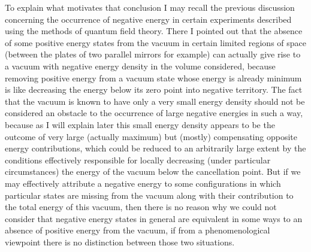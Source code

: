\documentclass[notitlepage,12pt]{report}
\begin{document}
To explain what motivates that conclusion I may recall the previous discussion concerning the occurrence of negative energy in certain experiments described using the methods of quantum field theory. There I pointed out that the absence of some positive energy states from the vacuum in certain limited regions of space (between the plates of two parallel mirrors for example) can actually give rise to a vacuum with negative energy density in the volume considered, because removing positive energy from a vacuum state whose energy is already minimum is like decreasing the energy below its zero point into negative territory. The fact that the vacuum is known to have only a very small energy density should not be considered an obstacle to the occurrence of large negative energies in such a way, because as I will explain later this small energy density appears to be the outcome of very large (actually maximum) but (mostly) compensating opposite energy contributions, which could be reduced to an arbitrarily large extent by the conditions effectively responsible for locally decreasing (under particular circumstances) the energy of the vacuum below the cancellation point. But if we may effectively attribute a negative energy to some configurations in which particular states are missing from the vacuum along with their contribution to the total energy of this vacuum, then there is no reason why we could not consider that negative energy states in general are equivalent in some ways to an absence of positive energy from the vacuum, if from a phenomenological viewpoint there is no distinction between those two situations.
\end{document}
